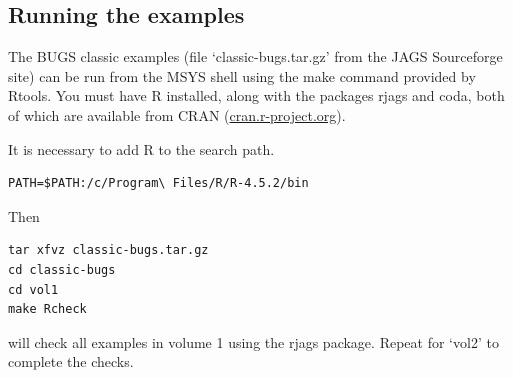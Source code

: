 \documentclass[11pt, a4paper, titlepage]{article}
\newcommand{\code}[1]{{\bgroup{\normalfont\ttfamily #1}\egroup}}
\newcommand{\file}[1]{{`\normalfont\textsf{#1}'}}
\let\command=\code
\begin{document}
\subsection{Running the examples}

The BUGS classic examples (file \file{classic-bugs.tar.gz} from the
JAGS Sourceforge site) can be run from the MSYS shell
using the \command{make} command provided by Rtools. You must have R
installed, along with the packages \code{rjags} and \code{coda}, both
of which are available from CRAN (\url{cran.r-project.org}).

It is necessary to add R to the search path.
\begin{verbatim}
PATH=$PATH:/c/Program\ Files/R/R-4.5.2/bin
\end{verbatim}
Then
\begin{verbatim}
tar xfvz classic-bugs.tar.gz
cd classic-bugs
cd vol1
make Rcheck
\end{verbatim}
will check all examples in volume 1 using the \code{rjags} package. Repeat
for \file{vol2} to complete the checks.
\end{document}
